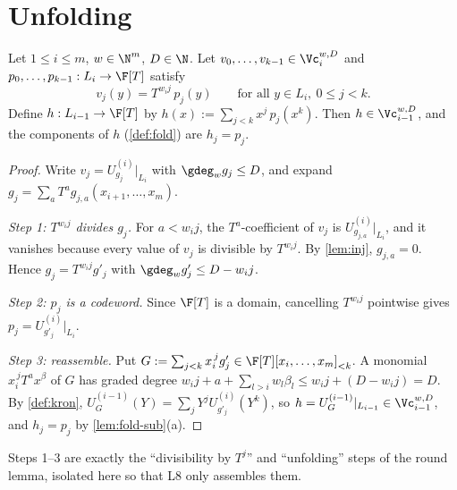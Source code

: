 \section{Unfolding}

\setcounter{lemma}{3}\begin{lemma}[Unfolding]\label{lem:unfold}
Let $1\le i\le m$, $w\in\N^m$, $D\in\N$. Let $v_0,\dots,v_{k-1}\in\Vc_i^{w,D}$ and
$p_0,\dots,p_{k-1}:L_i\to\F[T]$ satisfy
\[
v_j(y)=T^{w_ij}\,p_j(y)\qquad\text{for all }y\in L_i,\ 0\le j<k .
\]
Define $h:L_{i-1}\to\F[T]$ by $h(x):=\sum_{j<k}x^j\,p_j(x^k)$. Then
$h\in\Vc_{i-1}^{w,D}$, and the components of $h$ (\cref{def:fold}) are $h_j=p_j$.
\end{lemma}

\begin{proof}
Write $v_j=U^{(i)}_{g_j}|_{L_i}$ with $\gdeg_w g_j\le D$, and expand
$g_j=\sum_a T^a g_{j,a}(x_{i+1},\dots,x_m)$.

\emph{Step 1: $T^{w_ij}$ divides $g_j$.} For $a<w_ij$, the $T^a$-coefficient of $v_j$ is
$U^{(i)}_{g_{j,a}}|_{L_i}$, and it vanishes because every value of $v_j$ is divisible by
$T^{w_ij}$. By \cref{lem:inj}, $g_{j,a}=0$. Hence $g_j=T^{w_ij}g'_j$ with
$\gdeg_w g'_j\le D-w_ij$.

\emph{Step 2: $p_j$ is a codeword.} Since $\F[T]$ is a domain, cancelling $T^{w_ij}$
pointwise gives $p_j=U^{(i)}_{g'_j}|_{L_i}$.

\emph{Step 3: reassemble.} Put $G:=\sum_{j<k}x_i^{\,j}g'_j\in\F[T][x_i,\dots,x_m]_{<k}$. A
monomial $x_i^{\,j}T^ax^\beta$ of $G$ has graded degree $w_ij+a+\sum_{l>i}w_l\beta_l\le
w_ij+(D-w_ij)=D$. By \cref{def:kron},
$U^{(i-1)}_G(Y)=\sum_jY^jU^{(i)}_{g'_j}(Y^k)$, so $h=U^{(i-1)}_G|_{L_{i-1}}\in\Vc_{i-1}^{w,D}$,
and $h_j=p_j$ by \cref{lem:fold-sub}(a).
\end{proof}

\begin{remark}
Steps 1--3 are exactly the ``divisibility by $T^j$'' and ``unfolding'' steps of the
round lemma, isolated here so that L8 only assembles them.
\end{remark}
